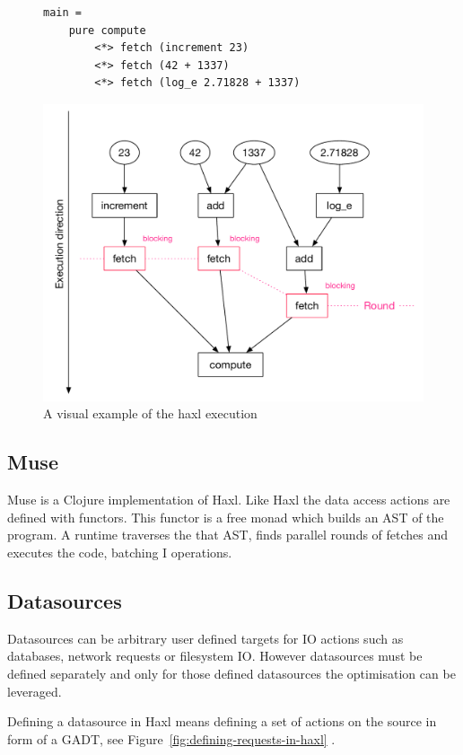 \begin{figure}
\begin{verbatim}
main =
    pure compute
        <*> fetch (increment 23)
        <*> fetch (42 + 1337)
        <*> fetch (log_e 2.71828 + 1337)
\end{verbatim}
    \includegraphics[width=\linewidth]{../Figures/haxl-basic-example}
    \caption{A visual example of the haxl execution}
    \label{fig:haxl-basic-example}
\end{figure}

\subsection{Muse}

Muse\cite{Muse:repository:link} is a Clojure implementation of Haxl.
Like Haxl the data access actions are defined with functors.
This functor is a free monad which builds an AST of the program.
A runtime traverses the that AST, finds parallel rounds of fetches and executes the code, batching I operations.

\subsection{Datasources}

Datasources can be arbitrary user defined targets for IO actions such as databases, network requests or filesystem IO.
However datasources must be defined separately and only for those defined datasources the optimisation can be leveraged.

Defining a datasource in Haxl means defining a set of actions on the source in form of a GADT, see Figure~\ref{fig:defining-requests-in-haxl} .

